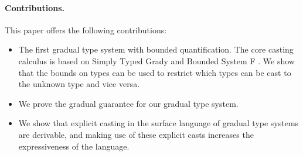 \paragraph{Contributions.} This paper offers the following contributions:
\begin{itemize}
\item The first gradual type system with bounded quantification.  The
  core casting calculus is based on Simply Typed Grady \cite{Eades:17}
  and Bounded System F \cite{Pierce:2002:TPL:509043}.  We show that
  the bounds on types can be used to restrict which types can be cast
  to the unknown type and vice versa.

\item We prove the gradual guarantee for our gradual type system.

\item We show that explicit casting in the surface language of gradual
  type systems are derivable, and making use of these explicit casts
  increases the expressiveness of the language.
\end{itemize}

